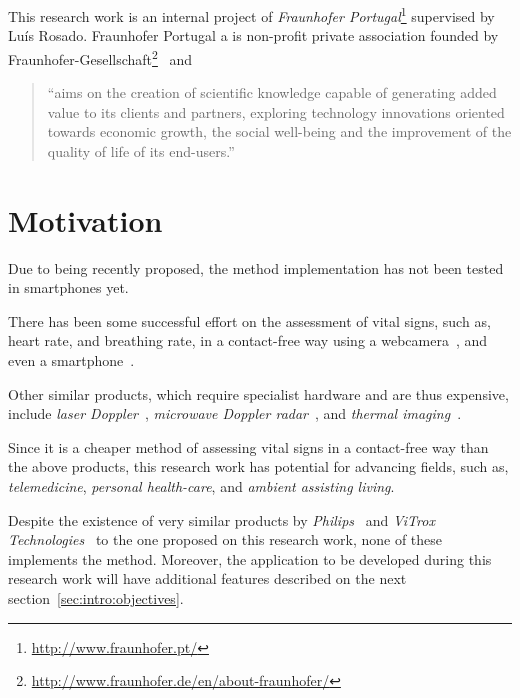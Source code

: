 This research work is an internal project of \emph{Fraunhofer
Portugal}\footnote{\url{http://www.fraunhofer.pt/}} supervised by
Luís Rosado. Fraunhofer Portugal a is non-profit private association
founded by Fraunhofer-Gesellschaft\footnote{\url{http://www.fraunhofer.de/en/about-fraunhofer/}}~\cite{Fraunhofer2013} and

\begin{quote}
  ``aims on the creation of scientific knowledge capable of
  generating added value to its clients and partners, exploring
  technology innovations oriented towards economic growth, the
  social well-being and the improvement of the quality of life of
  its end-users.''~\cite{Fraunhofer2013}
\end{quote}

\section{Motivation} \label{sec:intro:motivation}


Due to being recently proposed, the \evm{} method implementation
has not been tested in smartphones yet.

There has been some successful effort on the assessment of vital
signs, such as, heart rate, and breathing rate, in a contact-free
way using a webcamera~\cite{Wu2012Eulerian, Poh2010Non, Poh2011Advancements},
and even a smartphone~\cite{Vitrox2013, Philips2013}.

Other similar products, which require specialist hardware and are
thus expensive, include \emph{laser Doppler}~\cite{Ulyanov1993Pulse},
\emph{microwave Doppler radar}~\cite{Greneker1997Radar}, and
\emph{thermal imaging}~\cite{Garbey2007Contact}.

Since it is a cheaper method of assessing vital signs in a
contact-free way than the above products, this research work has
potential for advancing fields, such as, \emph{telemedicine},
\emph{personal health-care}, and \emph{ambient assisting living}.

Despite the existence of very similar products by
\emph{Philips}~\cite{Philips2013} and
\emph{ViTrox Technologies}~\cite{Vitrox2013}
to the one proposed on this research work, none of these implements
the \evm{} method. Moreover, the application to be developed
during this research work will have additional features described on
the next section~\ref{sec:intro:objectives}.

